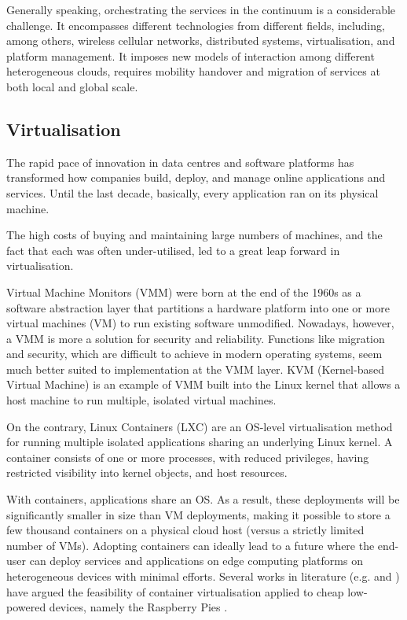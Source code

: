 Generally speaking, orchestrating the services in the continuum is a considerable challenge. It encompasses different technologies from different fields, including, among others, wireless cellular networks, distributed systems, virtualisation, and platform management. It imposes new models of interaction among different heterogeneous clouds, requires mobility handover and migration of services at both local and global scale.

\subsection{Virtualisation}
\label{sec:virtualisation}

The rapid pace of innovation in data centres and software platforms has transformed how companies build, deploy, and manage online applications and services. Until the last decade, basically, every application ran on its physical machine.

The high costs of buying and maintaining large numbers of machines, and the fact that each was often under-utilised, led to a great leap forward in virtualisation.

Virtual Machine Monitors (VMM) \cite{vmm} were born at the end of the 1960s as a software abstraction layer that partitions a hardware platform into one or more virtual machines (VM) to run existing software unmodified. Nowadays, however, a VMM is more a solution for security and reliability. Functions like migration and security, which are difficult to achieve in modern operating systems, seem much better suited to implementation at the VMM layer. KVM (Kernel-based Virtual Machine) \cite{kvm} is an example of VMM built into the Linux kernel that allows a host machine to run multiple, isolated virtual machines. 

On the contrary, Linux Containers (LXC) \cite{containers} are an OS-level virtualisation method for running multiple isolated applications sharing an underlying Linux kernel. A container consists of one or more processes, with reduced privileges, having restricted visibility into kernel objects, and host resources.

With containers, applications share an OS. As a result, these deployments will be significantly smaller in size than VM deployments, making it possible to store a few thousand containers on a physical cloud host (versus a strictly limited number of VMs). Adopting containers can ideally lead to a future where the end-user can deploy services and applications on edge computing platforms on heterogeneous devices with minimal efforts. Several works in literature (e.g. \cite{containers-raspberry} and \cite{containers-fog}) have argued the feasibility of container virtualisation applied to cheap low-powered devices, namely the Raspberry Pies \cite{raspberry}.

